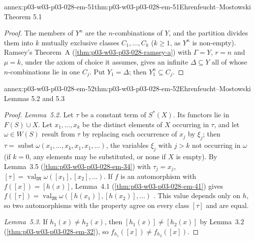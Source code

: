 \begin{annexitem}{annex:p03-w03-p03-028-em-51}{thm:p03-w03-p03-028-em-51}{Ehrenfeucht--Mostowski Theorem 5.1}
\begin{proof}
The members of \(Y^n\) are the \(n\)-combinations of \(Y\), and the partition
divides them into \(k\) mutually exclusive classes \(C_1,\ldots,C_k\)
(\(k\geq1\), as \(Y^n\) is non-empty).  Ramsey's Theorem~A
(\cref{thm:p03-w03-p03-028-ramsey-a}) with \(\Gamma=Y\), \(r=n\) and \(\mu=k\),
under the axiom of choice it assumes, gives an infinite \(\Delta\subseteq Y\) all
of whose \(n\)-combinations lie in one \(C_j\).  Put \(Y_1=\Delta\); then
\(Y_1^n\subseteq C_j\).
\end{proof}
\end{annexitem}

\begin{annexitem}{annex:p03-w03-p03-028-em-52}{thm:p03-w03-p03-028-em-52}{Ehrenfeucht--Mostowski Lemmas 5.2 and 5.3}
\begin{proof}
\emph{Lemma~5.2.}  Let \(\tau\) be a constant term of \(S^*(X)\).  Its functors
lie in \(F(S)\cup X\).  Let \(x_1,\ldots,x_k\) be the distinct elements of \(X\)
occurring in \(\tau\), and let \(\omega\in W(S)\) result from \(\tau\) by
replacing each occurrence of \(x_j\) by \(\xi_j\); then
\(\tau=\operatorname{subst}\omega(x_1,\ldots,x_k,x_1,x_1,\ldots)\), the
variables \(\xi_j\) with \(j>k\) not occurring in \(\omega\) (if \(k=0\), any
elements may be substituted, or none if \(X\) is empty).  By Lemma~3.5
(\cref{thm:p03-w03-p03-028-em-34}) with \(\tau_j=x_j\),
\([\tau]=\operatorname{val}_{\mathfrak M}\omega([x_1],[x_2],\ldots)\).  If \(f\)
is an automorphism with \(f([x])=[h(x)]\), Lemma~4.1
(\cref{thm:p03-w03-p03-028-em-41}) gives
\(f([\tau])=\operatorname{val}_{\mathfrak M}\omega([h(x_1)],[h(x_2)],\ldots)\)
\cite[p.~57]{EhrenfeuchtMostowski1956}.  This value depends only on \(h\), so
two automorphisms with the property agree on every class \([\tau]\) and are
equal.

\emph{Lemma~5.3.}  If \(h_1(x)\neq h_2(x)\), then
\([h_1(x)]\neq[h_2(x)]\) by Lemma~3.2 (\cref{thm:p03-w03-p03-028-em-32}), so
\(f_{h_1}([x])\neq f_{h_2}([x])\).
\end{proof}
\end{annexitem}


